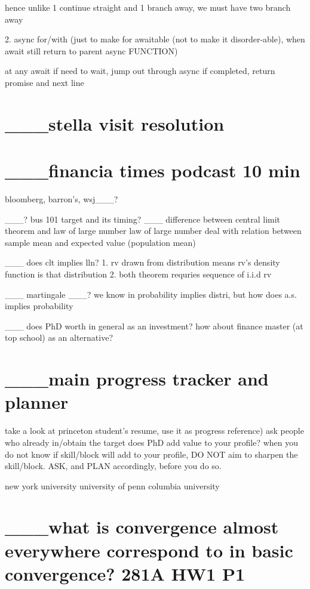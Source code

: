 {{{{{{{{{{hence unlike 1 continue straight and 1 branch away, we must have two branch away
	
2. async for/with (just to make for awaitable (not to make it disorder-able), when await still return to parent async FUNCTION)

	at any await
	if need to wait, jump out through async
	if completed, return promise and next line




\section*{___stella visit resolution}




	


\section*{___financia times podcast 10 min}
bloomberg, barron's, wsj___?


___? bus 101 target and its timing?
___ difference between central limit theorem and law of large number
	law of large number deal with relation between sample mean and expected value (population mean)
	
	___ does clt implies lln?
	1. rv drawn from distribution means rv's density function is that distribution
	2. both theorem requries sequence of i.i.d rv
	
	
___ martingale
___? we know in probability implies distri, but how does a.s. implies probability

___ does PhD worth in general as an investment? how about finance master (at top school) as an alternative?





\section*{___main progress tracker and planner}
take a look at princeton student's resume, use it as progress reference)
ask people who already in/obtain the target
does PhD add value to your profile?
when you do not know if skill/block will add to your profile, DO NOT aim to sharpen the skill/block. ASK, and PLAN accordingly, before you do so.


new york university
university of penn
columbia university

\section*{___what is convergence almost everywhere correspond to in basic convergence? 281A HW1 P1}

}}}}}}}}}}
